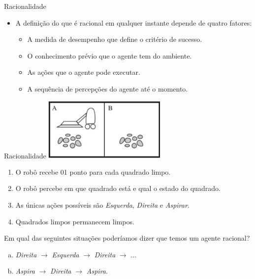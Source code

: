 \documentclass{libs/ufc_format}
\begin{document}
\begin{frame}{Racionalidade}
    \begin{itemize}
        \justifying
        \item<1> A definição do que é racional em qualquer instante depende de quatro fatores:
            \begin{itemize}
                \justifying
                \item A medida de desempenho que define o critério de sucesso.
                \item O conhecimento prévio que o agente tem do ambiente.
                \item As ações que o agente pode executar.
                \item A sequência de percepções do agente até o momento.
            \end{itemize}
    \end{itemize}
\end{frame}

\begin{frame}{Racionalidade}
    \centering
    \includegraphics[width=0.45\textwidth]{figuras/figura03}
    \begin{enumerate}
        \justifying
        \item O robô recebe 01 ponto para cada quadrado limpo.
        \item O robô percebe em que quadrado está e qual o estado do quadrado.
        \item As únicas ações possíveis são \textit{Esquerda}, \textit{Direita} e \textit{Aspirar}.
        \item Quadrados limpos permanecem limpos.
    \end{enumerate}
    \justifying
    Em qual das seguintes situações poderíamos dizer que temos um agente racional?
        \begin{enumerate}[(a)]
            \item \textit{Direita} $\rightarrow$ \textit{Esquerda} $\rightarrow$ \textit{Direita} $\rightarrow$ ...
            \item \textit{Aspira} $\rightarrow$ \textit{Direita} $\rightarrow$ \textit{Aspira}.
        \end{enumerate}
\end{frame}
\end{document}
